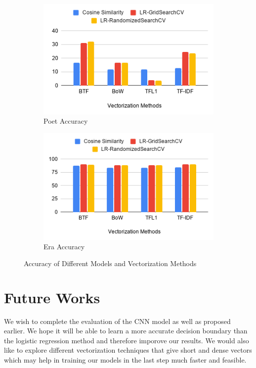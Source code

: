 \documentclass[11pt,a4paper]{article}
\begin{document}
\begin{figure}[htb!]
    \centering
    \begin{subfigure}{.5\textwidth}
      \centering
      \includegraphics[width=\linewidth]{Poet.png}
      \caption{Poet Accuracy}
      \label{fig:sub1}
    \end{subfigure}%
    \begin{subfigure}{.5\textwidth}
      \centering
      \includegraphics[width=\linewidth]{Era.png}
      \caption{Era Accuracy}
      \label{fig:sub2}
    \end{subfigure}
    \caption{Accuracy of Different Models and Vectorization Methods} 
    \label{histogram}
\end{figure}

\section{Future Works}
We wish to complete the evaluation of the CNN model as well as proposed earlier. We hope it will be able to learn a more accurate decision boundary than the logistic regression method and therefore imporove our results. We would also like to explore different vectorization techniques that give short and dense vectors which may help in training our models in the last step much faster and feasible.
\end{document}

